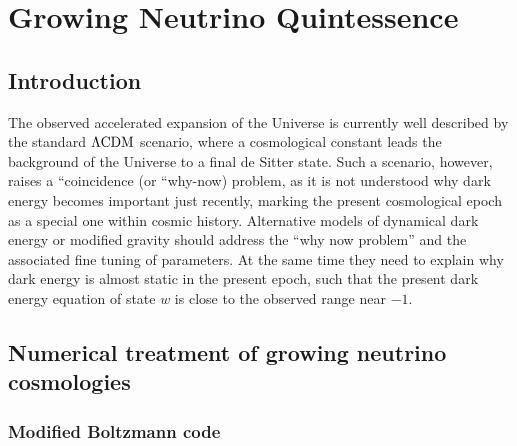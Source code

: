 \chapter{Growing Neutrino Quintessence \label{chap:GNQ}}



\section{Introduction}



The observed accelerated expansion of the Universe is currently well
described by the standard $\Lambda\mathrm{CDM}$ scenario, where a cosmological
constant leads the background of the Universe to a final de Sitter
state. Such a scenario, however, raises a ``coincidence\textquotedbl{}
(or ``why-now\textquotedbl{}) problem, as it is not understood why
dark energy becomes important just recently, marking the present cosmological
epoch as a special one within cosmic history. Alternative models of
dynamical dark energy or modified gravity should address the ``why
now problem'' and the associated fine tuning of parameters. At the
same time they need to explain why dark energy is almost static in
the present epoch, such that the present dark energy equation of state
$w$ is close to the observed range near $-1$.



\section{Numerical treatment of growing neutrino cosmologies}


\subsection{Modified Boltzmann code\label{sub:Modified-Boltzmann-code}}

